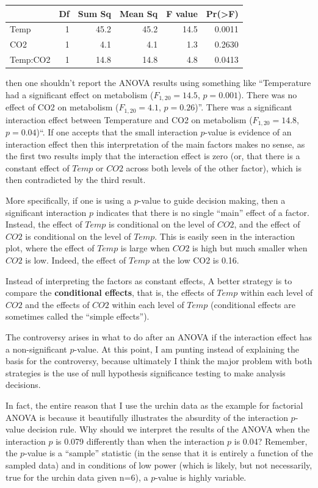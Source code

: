 \documentclass[]{book}
\begin{document}
\begin{tabular}{l|r|r|r|r|r}
\hline
  & Df & Sum Sq & Mean Sq & F value & Pr(>F)\\
\hline
Temp & 1 & 45.2 & 45.2 & 14.5 & 0.0011\\
\hline
CO2 & 1 & 4.1 & 4.1 & 1.3 & 0.2630\\
\hline
Temp:CO2 & 1 & 14.8 & 14.8 & 4.8 & 0.0413\\
\hline
\end{tabular}

then one shouldn't report the ANOVA results using something like
``Temperature had a significant effect on metabolism
(\(F_{1,20} = 14.5\), \(p=0.001\)). There was no effect of CO2 on
metabolism (\(F_{1,20} = 4.1\), \(p=0.26\))''. There was a significant
interaction effect between Temperature and CO2 on metabolism
(\(F_{1,20} = 14.8\), \(p=0.04\))``. If one accepts that the small
interaction \(p\)-value is evidence of an interaction effect then this
interpretation of the main factors makes no sense, as the first two
results imply that the interaction effect is zero (or, that there is a
constant effect of \(Temp\) or \(CO2\) across both levels of the other
factor), which is then contradicted by the third result.

More specifically, if one is using a \(p\)-value to guide decision
making, then a significant interaction \(p\) indicates that there is no
single ``main'' effect of a factor. Instead, the effect of \(Temp\) is
conditional on the level of \(CO2\), and the effect of \(CO2\) is
conditional on the level of \(Temp\). This is easily seen in the
interaction plot, where the effect of \(Temp\) is large when \(CO2\) is
high but much smaller when \(CO2\) is low. Indeed, the effect of
\(Temp\) at the low CO2 is 0.16.

Instead of interpreting the factors as constant effects, A better
strategy is to compare the \textbf{conditional effects}, that is, the
effects of \(Temp\) within each level of \(CO2\) and the effects of
\(CO2\) within each level of \(Temp\) (conditional effects are sometimes
called the ``simple effects'').

The controversy arises in what to do after an ANOVA if the interaction
effect has a non-significant \(p\)-value. At this point, I am punting
instead of explaining the basis for the controversy, because ultimately
I think the major problem with both strategies is the use of null
hypothesis significance testing to make analysis decisions.

In fact, the entire reason that I use the urchin data as the example for
factorial ANOVA is because it beautifully illustrates the absurdity of
the interaction \(p\)-value decision rule. Why should we interpret the
results of the ANOVA when the interaction \(p\) is 0.079 differently
than when the interaction \(p\) is 0.04? Remember, the \(p\)-value is a
``sample'' statistic (in the sense that it is entirely a function of the
sampled data) and in conditions of low power (which is likely, but not
necessarily, true for the urchin data given n=6), a \(p\)-value is
highly variable.
\end{document}
